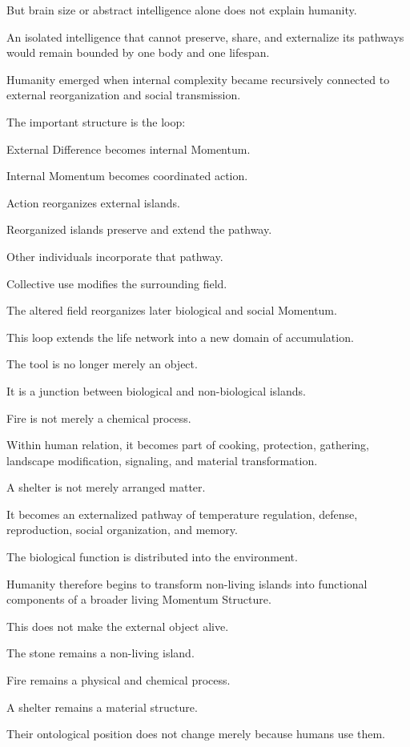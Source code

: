 But brain size or abstract intelligence alone does not explain humanity.

An isolated intelligence that cannot preserve, share, and externalize its pathways would remain bounded by one body and one lifespan.

Humanity emerged when internal complexity became recursively connected to external reorganization and social transmission.

The important structure is the loop:

External Difference becomes internal Momentum.

Internal Momentum becomes coordinated action.

Action reorganizes external islands.

Reorganized islands preserve and extend the pathway.

Other individuals incorporate that pathway.

Collective use modifies the surrounding field.

The altered field reorganizes later biological and social Momentum.

This loop extends the life network into a new domain of accumulation.

The tool is no longer merely an object.

It is a junction between biological and non-biological islands.

Fire is not merely a chemical process.

Within human relation, it becomes part of cooking, protection, gathering, landscape modification, signaling, and material transformation.

A shelter is not merely arranged matter.

It becomes an externalized pathway of temperature regulation, defense, reproduction, social organization, and memory.

The biological function is distributed into the environment.

Humanity therefore begins to transform non-living islands into functional components of a broader living Momentum Structure.

This does not make the external object alive.

The stone remains a non-living island.

Fire remains a physical and chemical process.

A shelter remains a material structure.

Their ontological position does not change merely because humans use them.

